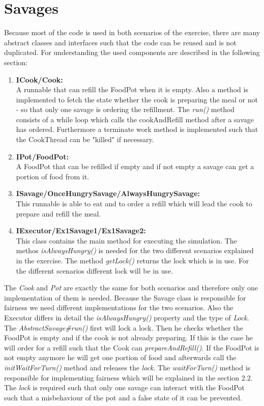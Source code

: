\documentclass{article}
\begin{document}
	\pagestyle{fancy}
	\section{Savages}
	\begin{adjustwidth}{2em}{2em}
		Because most of the code is used in both scenarios of the exercise, there are many abstract classes and interfaces such that the code can be reused and is not duplicated. For understanding the used components are described in the following section:
		\begin{adjustwidth}{1em}{1em}
			\begin{enumerate}[-]
				\item \textbf{ICook/Cook:} \\
				A runnable that can refill the FoodPot when it is empty. Also a method is implemented to fetch the state whether the cook is preparing the meal or not - so that only one savage is ordering the refillment. The \textit{run()} method consists of a while loop which calls the cookAndRefill method after a savage has ordered. Furthermore a terminate work method is implemented such that the CookThread can be "killed" if necessary.
				\item \textbf{IPot/FoodPot:} \\
				A FoodPot that can be refilled if empty and if not empty a savage can get a portion of food from it.
				\item \textbf{ISavage/OnceHungrySavage/AlwaysHungrySavage:} \\
				This runnable is able to eat and to order a refill which will lead the cook to prepare and refill the meal.
				\item \textbf{IExecutor/Ex1Savage1/Ex1Savage2:} \\
				This class contains the main method for executing the simulation. The methos \textit{isAlwaysHungry()} is needed for the two different scenarios explained in the exercise. The method \textit{getLock()} returns the lock which is in use. For the different scenarios different lock will be in use.
			\end{enumerate}
		\end{adjustwidth}
		The \textit{Cook} and \textit{Pot} are exactly the same for both scenarios and therefore only one implementation of them is needed. Because the Savage class is responsible for fairness we need different implementations for the two scenarios. Also the Executor differs in detail the \textit{isAlwaysHungry()} property and the type of \textit{Lock}. \\
		The \textit{AbstractSavage\#run()} first will lock a lock. Then he checks whether the FoodPot is empty and if the cook is not already preparing. If this is the case he will order for a refill such that the Cook can \textit{prepareAndRefill()}. If the FoodPot is not empty anymore he will get one portion of food and afterwards call the \textit{initWaitForTurn()} method and releases the \textit{lock}. The \textit{waitForTurn()} method is responsible for implementing fairness which will be explained in the section 2.2. The \textit{lock} is required such that only one savage can interact with the FoodPot such that a misbehaviour of the pot and a false state of it can be prevented.

\end{adjustwidth}
\end{document}
